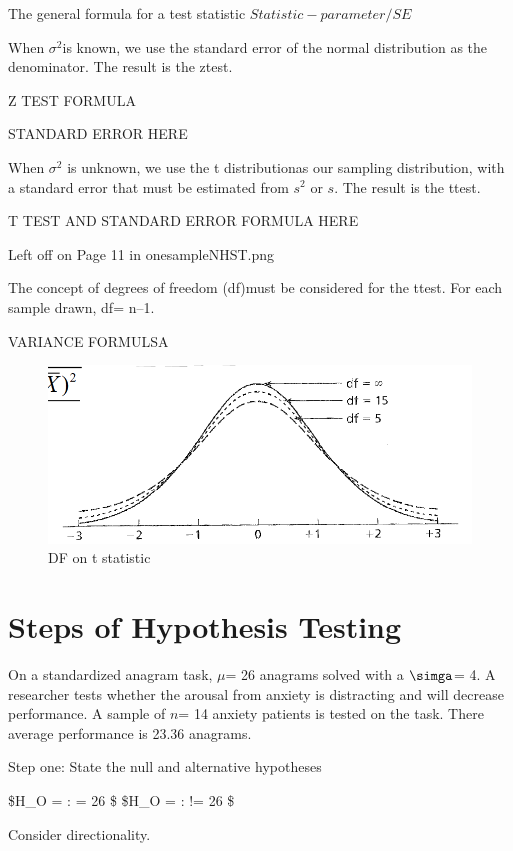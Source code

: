 \documentclass[]{book}
\theoremstyle{definition}
\theoremstyle{definition}
\theoremstyle{definition}
\theoremstyle{remark}
\begin{document}
The general formula for a test statistic \(Statistic - parameter /SE\)

When \(\sigma^2\)is known, we use the standard error of the normal
distribution as the denominator. The result is the ztest.

Z TEST FORMULA

STANDARD ERROR HERE

When \(\sigma^2\) is unknown, we use the t distributionas our sampling
distribution, with a standard error that must be estimated from \(s^2\)
or \(s\). The result is the ttest.

T TEST AND STANDARD ERROR FORMULA HERE

Left off on Page 11 in onesampleNHST.png

The concept of degrees of freedom (df)must be considered for the ttest.
For each sample drawn, df= n--1.

VARIANCE FORMULSA

\begin{figure}
\centering
\includegraphics{img/hickssampling5.png}
\caption{DF on t statistic}
\end{figure}

\section{Steps of Hypothesis Testing}\label{steps-of-hypothesis-testing}

On a standardized anagram task, \(\mu\)= 26 anagrams solved with a
\(\simga\)= 4. A researcher tests whether the arousal from anxiety is
distracting and will decrease performance. A sample of \(n\)= 14 anxiety
patients is tested on the task. There average performance is 23.36
anagrams.

Step one: State the null and alternative hypotheses

\$H\_O = : \mu = 26 \$ \$H\_O = : \mu != 26 \$

Consider directionality.
\end{document}
